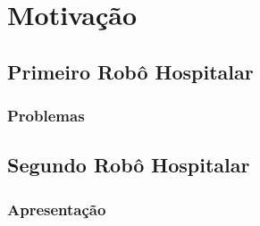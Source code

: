 \documentclass[../delivery_hospital_report.tex]{subfiles}
\begin{document}
\chapter{Motivação}


\section{Primeiro Robô Hospitalar}
\subsection{Problemas}
\section{Segundo Robô Hospitalar}
\subsection{Apresentação}
\end{document}
